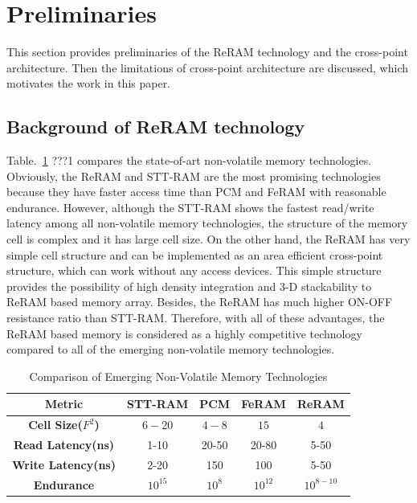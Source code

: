 \section{Preliminaries}\label{sec:preliminary}

This section provides preliminaries of the ReRAM technology and the cross-point architecture. Then the limitations of cross-point architecture are discussed, which motivates the work in this paper.


\subsection{Background of ReRAM technology}
Table.~\ref{table:compare} ???1 compares the state-of-art non-volatile memory technologies. Obviously, the ReRAM and STT-RAM are the most promising technologies because they have faster access time than PCM and FeRAM with reasonable endurance. However, although the STT-RAM shows the fastest read/write latency among all non-volatile memory technologies, the structure of the memory cell is complex and it has large cell size. On the other hand, the ReRAM has very simple cell structure and can be implemented as an area efficient cross-point structure, which can work without any access devices. This simple structure provides the possibility of high density integration and 3-D stackability to ReRAM based memory array. Besides, the ReRAM has much higher ON-OFF resistance ratio than STT-RAM. Therefore, with all of these advantages, the ReRAM based memory is considered as a highly competitive technology compared to all of the emerging non-volatile memory technologies.

\begin{table}[!tb]
  \centering
  \scriptsize
    \scriptsize
  \caption{Comparison of Emerging Non-Volatile Memory Technologies}\label{table:compare}
  \vspace{-5pt}
  \begin{tabular}{|c|cccc|}
    \hline
    \textbf{Metric} & \textbf{STT-RAM} & \textbf{PCM}    & \textbf{FeRAM} & \textbf{ReRAM}
    \\\hline
    \textbf{Cell Size($F^2$)} & $6-20$ & $4-8$ & $15$ & $4$\\\hline
    \textbf{Read Latency(ns)} &  1-10 & 20-50 & 20-80 & 5-50\\\hline
    \textbf{Write Latency(ns)} & 2-20& 150& 100& 5-50\\\hline
    \textbf{Endurance} &  $10^{15}$ & $10^8$ & $10^{12}$ & $10^{8-10}$\\\hline
  \end{tabular}
  \vspace{-10pt}
\end{table}


